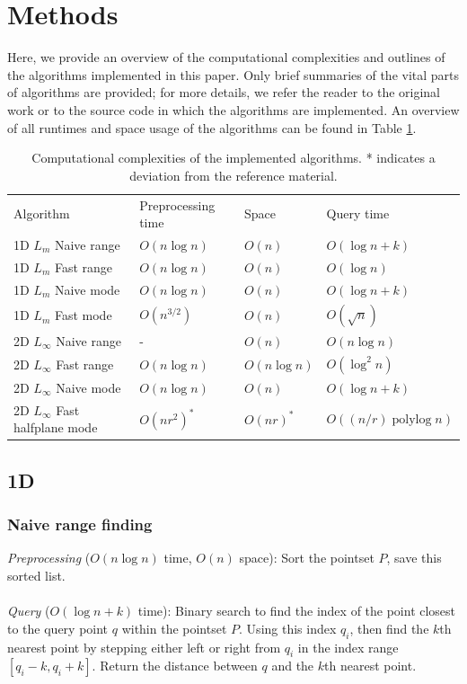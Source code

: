 \documentclass{article}
\newcommand{\fb}[1]{{#1}}
\DeclareMathOperator{\polylog}{polylog}
\begin{document}
\section{Methods}
Here, we provide an overview of the computational complexities and outlines of
the algorithms implemented in this paper. Only brief summaries of the vital
parts of algorithms are provided; for more details, we refer the reader to the
original work or to the source code in which the algorithms are implemented. An
overview of all runtimes and space usage of the algorithms can be found in
Table \ref{tab:runtimes}.
\begin{table}[h]
    \centering
    \begin{tabular}{llll}
        \toprule
        Algorithm   & Preprocessing time & Space         & Query time                 \\
        \cmidrule(lr){1-1}\cmidrule(lr){2-4}
        1D $L_{m}$ Naive range & $O(n \log n)$      & $O(n)$        & $O(\log n + k)$            \\
        1D $L_{m}$ Fast range  & $O(n \log n)$      & $O(n)$        & $O(\log n)$                \\
        1D $L_{m}$ Naive mode  & \fb{$O(n \log n)$} & \fb{$O(n)$}   & \fb{$O(\log n + k)$}       \\
        1D $L_{m}$ Fast mode   & $O(n^{3/2})$       & $O(n)$        & $O(\sqrt{n})$              \\
        \addlinespace[0.6em]
        2D $L_{\infty}$ Naive range & \fb{-}      & \fb{$O(n)$}       & \fb{$O(n \log n )$}           \\
        2D $L_{\infty}$ Fast range  & $O(n \log n)$      & $O(n \log n)$ & $O(\log^2 n)$              \\
        2D $L_{\infty}$ Naive mode  & $\fb{O(n \log n)}$ & $O(n)$        & \fb{$O(\log n + k)$}       \\
        2D $L_{\infty}$ Fast halfplane mode   & $\fb{O(nr^2)^*}$   & $O(nr)^*$     & $\fb{O((n/r) \polylog n)}$ \\
        \bottomrule
    \end{tabular}
    \caption{Computational complexities of the implemented algorithms. * indicates a deviation from the reference material.}
    \label{tab:runtimes}
\end{table}
\subsection{1D}
\subsubsection{Naive range finding}
\textit{Preprocessing} ($O(n \log n)$ time, $O(n)$ space): Sort the pointset $P$, save this sorted list. \\\\
\textit{Query} ($O(\log n + k)$ time): Binary search to find the index of the point closest to the query point $q$ within the pointset $P$. Using this index $q_i$, then find the $k$th nearest point by stepping either left or right from $q_i$ in the index range $[q_i-k, q_i+k]$. \fb{Return the distance between $q$ and the $k$th nearest point.}
\end{document}
